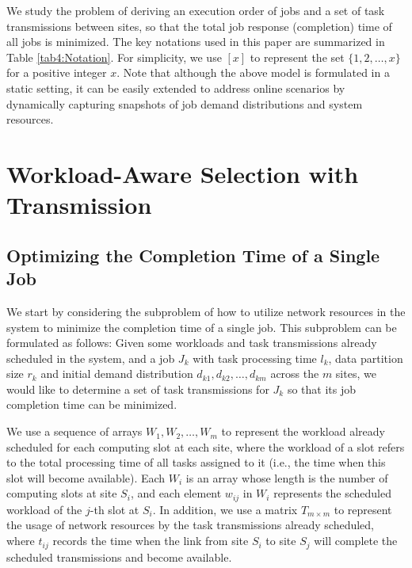 We study the problem of deriving an execution order of jobs and a set of task transmissions between sites, so that the total job response (completion) time of all jobs is minimized. %
The key notations used in this paper are summarized in Table \ref{tab4:Notation}. For simplicity, we use $[x]$ to represent the set $\{1, 2, \dots, x\}$ for a positive integer $x$. Note that although the above model is formulated in a static setting, it can be easily extended to address online scenarios by dynamically capturing snapshots of job demand distributions and system resources. %

\section{Workload-Aware Selection with Transmission}
\label{sec:WAST}

\subsection{Optimizing the Completion Time of a Single Job}
\label{sec:single1}
We start by considering the subproblem of how to utilize network resources in the system to minimize the completion time of a single job. This subproblem can be formulated as follows: Given some workloads and task transmissions already scheduled in the system, and a job $J_k$ with task processing time $l_k$, data partition size $r_k$ and initial demand distribution $d_{k1}, d_{k2}, \dots, d_{km}$ across the $m$ sites, %
we would like to determine a set of task transmissions for $J_k$ so that its job completion time can be minimized.

We use a sequence of arrays $W_1, W_2, \dots, W_m$ to represent the workload already scheduled for each computing slot at each site, where the workload of a slot refers to the total processing time of all tasks assigned to it (i.e., the time when this slot will become available). Each $W_i$ is an array whose length is the number of computing slots at site $S_i$, and each element $w_{ij}$ in $W_i$ represents the scheduled workload of the $j$-th slot at $S_i$. In addition, we use a matrix $T_{m \times m}$ to represent the usage of network resources by the task transmissions already scheduled, where $t_{ij}$ records the time when the link from site $S_i$ to site $S_j$ will complete the scheduled transmissions and become available.%

